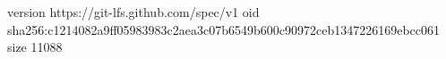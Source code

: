 version https://git-lfs.github.com/spec/v1
oid sha256:c1214082a9ff05983983c2aea3c07b6549b600c90972ceb1347226169ebcc061
size 11088
